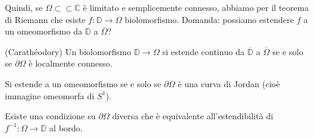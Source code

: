 Quindi, se $\Omega \subset\subset \mathbb{C}$ è limitato e semplicemente connesso, abbiamo per il teorema di Riemann che esiste $f:\mathbb{D} \longrightarrow \Omega$ biolomorfismo. Domanda: possiamo estendere $f$ a un omeomorfismo da $\overline{\mathbb{D}}$ a $\overline{\Omega}$?

\begin{thm}
  (Carathéodory) Un biolomorfismo $\mathbb{D} \longrightarrow \Omega$ si estende continuo da $\overline{\mathbb{D}}$ a $\overline{\Omega}$ se e solo se $\partial \Omega$ è localmente connesso.
\end{thm}

\begin{cor}
  Si estende a un omeomorfismo se e solo se $\partial\Omega$ è una curva di Jordan (cioè immagine omeomorfa di $S^1$).
\end{cor}

Esiste una condizione su $\partial\Omega$ diversa che è equivalente all'estendibilità di $f^{-1}:\Omega \longrightarrow \mathbb{D}$ al bordo.
